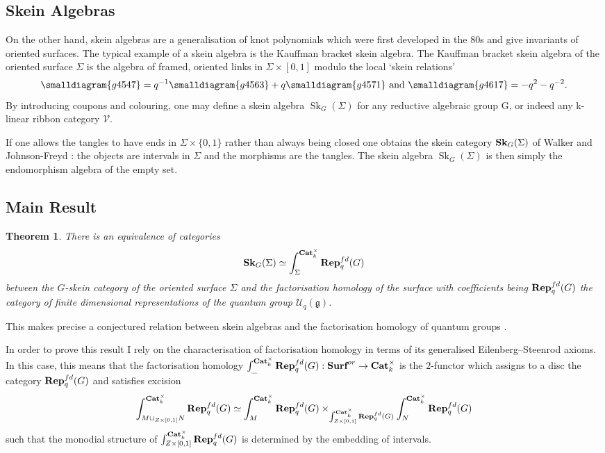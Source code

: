 \documentclass{article}
\newcommand{\catname}[1]{{\normalfont\textbf{#1}}}
\newcommand{\Cat}{\catname{Cat}}
\newcommand{\SK}{\catname{Sk}}
\newcommand{\Rep}{\catname{Rep}}
\newcommand{\Surf}{\catname{Surf}}
\newcommand{\Sk}{\operatorname{Sk}}
\newtheorem{thm}{Theorem}
\begin{document}
\subsection{Skein Algebras}

On the other hand, skein algebras are a generalisation of knot polynomials which were first developed in the 80s and give invariants of oriented surfaces. 
The typical example of a skein algebra is the Kauffman bracket skein algebra. The Kauffman bracket skein algebra of the oriented surface $\Sigma$ is the algebra of framed, oriented links in $\Sigma \times [0,1]$ modulo the local `skein relations'
\[
\smalldiagram{g4547} = q^{-1} \smalldiagram{g4563} + q\smalldiagram{g4571} \text{ and } \smalldiagram{g4617} = -q^{2} -q^{-2}.
\]
By introducing coupons and colouring, one may define a skein algebra $\Sk_G(\Sigma)$ for any reductive algebraic group G, or indeed any k-linear ribbon category $\mathscr{V}$. 

If one allows the tangles to have ends in $\Sigma \times \{0,1\}$ rather than always being closed one obtains the skein category $\SK_G(\Sigma)$ of Walker and Johnson-Freyd \cite{JohnsonFreyd19}: the objects are intervals in $\Sigma$ and the morphisms are the tangles. The skein algebra $\Sk_G(\Sigma)$ is then simply the endomorphism algebra of the empty set. 

\subsection{Main Result}
\begin{thm}  There is an equivalence of categories 
\[
\SK_G(\Sigma) \simeq \int_{\Sigma}^{\Cat_k^{\times}} \Rep^{fd}_q(G)
\]
between the $G$-skein category of the oriented surface $\Sigma$ and the factorisation homology of the surface with coefficients being $\Rep^{fd}_q(G)$ the category of finite dimensional representations of the quantum group $\mathcal{U}_q(\mathfrak{g})$.
\end{thm}

This makes precise a conjectured relation between skein algebras and the factorisation homology of quantum groups \cite{david1, JohnsonFreyd19}.

In order to prove this result I rely on the characterisation of factorisation homology in terms of its generalised Eilenberg–Steenrod axioms. In this case, this means that the factorisation homology $\int_{\_}^{\Cat_k^{\times}} \Rep^{fd}_q(G): \Surf^{or} \to \Cat_k^{\times}$ is the $2$-functor which assigns to a disc the category $\Rep^{fd}_q(G)$ and satisfies excision 
$$\int_{M \cup_{Z \times [0,1]} N}^{\Cat_k^{\times}} \Rep^{fd}_q(G) \simeq \int_{M}^{\Cat_k^{\times}} \Rep^{fd}_q(G) \times_{\int_{Z \times [0,1]}^{\Cat_k^{\times}} \Rep^{fd}_q(G) } \int_{N}^{\Cat_k^{\times}} \Rep^{fd}_q(G) $$
 such that the monodial structure of $\int_{Z \times [0,1]}^{\Cat_k^{\times}} \Rep^{fd}_q(G)$ is determined by the embedding of intervals. 
\end{document}
